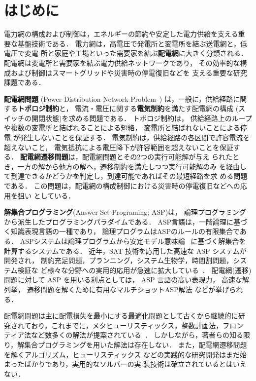 \chapter{はじめに}\label{chap:intro}

電力網の構成および制御は，エネルギーの節約や安定した電力供給を支える重
要な基盤技術である．
電力網は，高電圧で発電所と変電所を結ぶ送電網と，低電圧で変電
所と家庭や工場といった需要家を結ぶ\textbf{配電網}に大きく分類される．
配電網は変電所と需要家を結ぶ電力供給ネットワークであり，
その効率的な構成および制御はスマートグリッドや災害時の停電復旧などを
支える重要な研究課題である．

\textbf{配電網問題}
(Power Distribution Network Problem~\cite{Minato:dnet:ZDD,DBLP:journals/tsg/InoueTWKYKTMH14})
は，一般に，供給経路に関する\textbf{トポロジ制約}と，
電流・電圧に関する\textbf{電気制約}を満たす配電網の構成
(スイッチの開閉状態)を求める問題である．
トポロジ制約は，
供給経路上のループや複数の変電所と結ばれることによる短絡，
変電所と結ばれないことによる停電
が発生しないことを保証する．
電気制約は，供給経路の各区間で許容電流を超えないこと，
電気抵抗による電圧降下が許容範囲を超えないことを保証する．
%
\textbf{配電網遷移問題}は，配電網問題とその2つの実行可能解が与え
られたとき，一方の解から他方の解へ，遷移制約を満たしつつ実行可能解のみ
を経由して到達できるかどうかを判定し，到達可能であればその最短経路を求
める問題である．
この問題は，配電網の構成制御における災害時の停電復旧などへの応用を狙い
としている．

\textbf{解集合プログラミング}(Answer Set Programing; ASP\cite{%
  Baral03:cambridge,%
  Gelfond88:iclp,%
  Inoue08:jssst,%
  Niemela99:amai})は，
論理プログラミングから派生したプログラミングパラダイムである．
ASP言語は，一階論理に基づく知識表現言語の一種であり，
論理プログラムはASPのルールの有限集合である．
ASPシステムは論理プログラムから安定モデル意味論~\cite{Gelfond88:iclp}
に基づく解集合を計算するシステムである．
近年，SAT 技術を応用した高速な ASP システムが開発され，
制約充足問題，プランニング，システム生物学，時間割問題，システム検証な
ど様々な分野への実用的応用が急速に拡大している~\cite{%
  DBLP:journals/anor/BanbaraIKOSSTW19,%
  DBLP:journals/tplp/BanbaraKOS17,%
  ASPAISAT}．
配電網(遷移)問題に対して ASP を用いる利点としては，
ASP 言語の高い表現力，
高速な解列挙，
遷移問題を解くために有用なマルチショットASP解法
などが挙げられる．

配電網問題は主に配電損失を最小にする最適化問題として古くから継続的に研
究されており，これまでに，メタヒューリスティックス，整数計画法，フロン
ティア法など数多くの解法が提案されている~\cite{%
  ChiJum90,
  Hayashi:dnet:model,
  Minato:dnet:ZDD,
  DBLP:journals/tsg/InoueTWKYKTMH14}．
しかしながら，著者らの知る限り，解集合プログラミングを用いた解法は存在しない．
また，配電網遷移問題を解くアルゴリズム，ヒューリスティックス
などの実践的な研究開発はまだ始まったばかりであり，実用的なソルバーの実
装技術は確立されているとはいえない．

